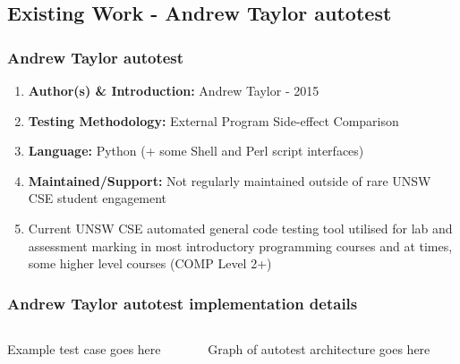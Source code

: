 \documentclass[xcolor]{beamer}
\begin{document}
\subsection{Existing Work - Andrew Taylor autotest}
\begin{frame}
	\frametitle{Andrew Taylor autotest}
	\begin{enumerate}
		\setlength\itemsep{1em}
		\item \textbf{Author(s) \& Introduction:} Andrew Taylor - 2015 
			\pause
		\item \textbf{Testing Methodology:} External Program Side-effect Comparison 
			\pause
		\item \textbf{Language:} Python (+ some Shell and Perl script interfaces) 
			\pause
		\item \textbf{Maintained/Support:} Not regularly maintained outside of rare UNSW CSE student engagement
			\pause 
		\item Current UNSW CSE automated general code testing tool utilised for lab and assessment marking in most introductory programming courses and at times, some higher level courses (COMP Level 2+) 
	\end{enumerate}
\end{frame}
\begin{frame}
	\frametitle{Andrew Taylor autotest implementation details}
	\begin{columns}
		\begin{column}{0.45\textwidth}
			Example test case goes here
		\end{column}
		\begin{column}{0.45\textwidth}
			Graph of autotest architecture goes here
		\end{column}
	\end{columns}
\end{frame}
\end{document}
